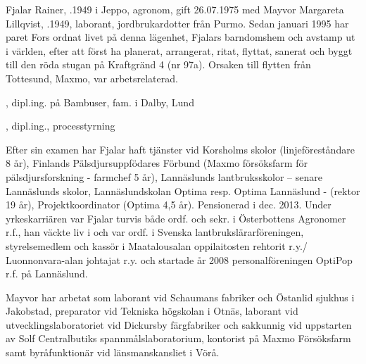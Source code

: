 %



%
Fjalar Rainer, .1949 i Jeppo, agronom, gift 26.07.1975 med Mayvor Margareta Lillqvist, .1949, laborant, jordbrukardotter från Purmo. Sedan januari 1995 har paret Fors ordnat livet på denna lägenhet, Fjalars barndomshem och avstamp ut i världen, efter att först ha planerat, arrangerat, ritat, flyttat, sanerat och	byggt till den röda stugan på Kraftgränd 4 (nr 97a). Orsaken till flytten från Tottesund, Maxmo, var arbetsrelaterad.
\begin{jhchildren}
  \item {}, dipl.ing. på Bambuser, fam. i Dalby, Lund
  \item {}, dipl.ing., processtyrning
\end{jhchildren}

Efter sin examen har Fjalar haft tjänster vid Korsholms skolor (linjeföreståndare 8 år), Finlands Pälsdjursuppfödares Förbund (Maxmo försöksfarm för pälsdjursforskning - farmchef 5 år), Lannäslunds lantbruksskolor -- senare Lannäslunds skolor, Lannäslundskolan Optima resp. Optima Lannäslund - (rektor 19 år), Projektkoordinator (Optima 4,5 år).	Pensionerad i dec. 2013. Under yrkeskarriären var Fjalar turvis både ordf. och sekr. i Österbottens Agronomer r.f., han väckte liv i och var ordf. i Svenska lantbrukslärarföreningen, styrelsemedlem och kassör i Maatalousalan oppilaitosten rehtorit r.y./ Luonnonvara-alan johtajat r.y. och startade år 2008 personalföreningen OptiPop r.f. på Lannäslund.

Mayvor har arbetat som laborant vid Schaumans fabriker och Östanlid sjukhus i Jakobstad, preparator vid Tekniska högskolan i Otnäs, laborant vid utvecklingslaboratoriet vid Dickursby färgfabriker och sakkunnig vid uppstarten av Solf Centralbutiks spannmålslaboratorium, kontorist på Maxmo Försöksfarm samt byråfunktionär vid länsmanskansliet i Vörå.

